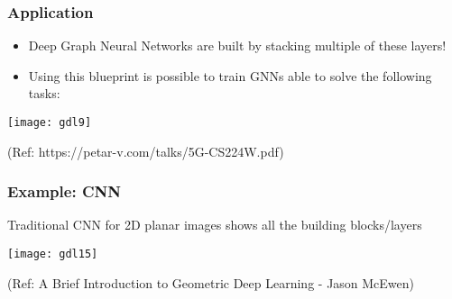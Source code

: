 \begin{frame}[fragile]\frametitle{Application}


\begin{itemize}
\item Deep Graph Neural Networks are built by stacking multiple of these layers!
\item Using this blueprint is possible to train GNNs able to solve the following tasks:
\end{itemize}
	
\begin{center}
\texttt{[image: gdl9]}
\end{center}

{\tiny (Ref: https://petar-v.com/talks/5G-CS224W.pdf)}	

\end{frame}


\begin{frame}[fragile]\frametitle{Example: CNN}

Traditional CNN for 2D planar images shows all the building blocks/layers

\begin{center}
\texttt{[image: gdl15]}
\end{center}


{\tiny (Ref: A Brief Introduction to Geometric Deep Learning - Jason McEwen)}

\end{frame}




